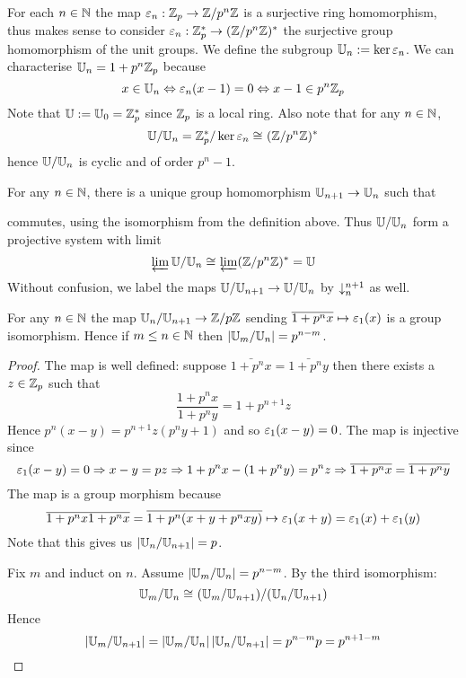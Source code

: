 \begin{dfn}[$\U_n$]
    For each $n \in \mathbb{N}$
    the map $\varepsilon_n: \mathbb{Z}_p \to \mathbb{Z}/p^{n}\mathbb{Z}$ is a surjective ring homomorphism,
    thus makes sense to consider $\varepsilon_n: \mathbb{Z}_p^* \to (\mathbb{Z}/p^{n}\mathbb{Z})^*$
    the surjective group homomorphism of the unit groups.
    We define the subgroup $\mathbb{U}_n := \ker \varepsilon_n$.
    We can characterise $\mathbb{U}_n = 1 + p^n \mathbb{Z}_p$ because
    \[x \in \mathbb{U}_n \Leftrightarrow \varepsilon_n(x - 1) = 0 \Leftrightarrow x - 1 \in p^n \mathbb{Z}_p\]
    Note that $\mathbb{U} := \mathbb{U}_0 = \mathbb{Z}_p^*$ since $\mathbb{Z}_p$ is a local ring.
    Also note that for any $n \in \mathbb{N}$,
    \[\mathbb{U} / \mathbb{U}_n = \mathbb{Z}_p^* / \ker \varepsilon_n \cong_{} (\mathbb{Z}/p^{n}\mathbb{Z})^*\]
    hence $\mathbb{U} / \mathbb{U}_n$ is cyclic and of order $p^n-1$.
\end{dfn}
\begin{prop}
    For any $n \in \mathbb{N}$, 
    there is a unique group homomorphism 
    $\mathbb{U}_{n+1} \to \mathbb{U}_n$ such that 
    \begin{center}
    \end{center}
    commutes, using the isomorphism from the definition above.
    Thus $\mathbb{U} / \mathbb{U}_n$ form a projective system with limit 
    \[\varprojlim \mathbb{U} / \mathbb{U}_n \cong_{} \varprojlim (\mathbb{Z}/p^{n}\mathbb{Z})^* = \mathbb{U}\]
    Without confusion, 
    we label the maps $\mathbb{U} / \mathbb{U}_{n + 1} \to \mathbb{U} / \mathbb{U}_n$
    by $\downarrow_{n}^{n+1}$ as well.
\end{prop}

\begin{prop}
    For any $n \in \mathbb{N}$ the map $\mathbb{U}_n / \mathbb{U}_{n+1} \to \mathbb{Z} / p\mathbb{Z}$
    sending $\overline{1 + p^n x} \mapsto \varepsilon_1 (x)$ is a group 
    isomorphism.
    Hence if $m \le n \in \mathbb{N}$ then $\left\vert \mathbb{U}_m / \mathbb{U}_n \right\vert = p^{n-m}$.
\end{prop}
\begin{proof}
    The map is well defined: suppose 
    $\bar{1 + p^n x} = \bar{1 + p^n y}$ then
    there exists a $z \in \mathbb{Z}_p$ such that
    \[\frac{1 + p^n x}{1 + p^n y} = 1 + p^{n+1} z\]
    Hence $p^n(x - y) = p^{n+1} z (p^n y + 1)$ and so 
    $\varepsilon_1(x - y) = 0$.
    The map is injective since 
    \[\varepsilon_1 (x - y) = 0 \Rightarrow x - y = p z 
    \Rightarrow 1 + p^n x - (1 + p^n y) = p^n z
    \Rightarrow \overline{1 + p^n x} = \overline{1 + p^n y}\]
    The map is a group morphism because 
    \[\overline{1 + p^n x}\overline{1 + p^n x} = \overline{1 + p^n (x + y + p^n xy)}
    \mapsto \varepsilon_1(x + y) = \varepsilon_1(x) + \varepsilon_1(y)\]
    Note that this gives us $\left\vert \mathbb{U}_n / \mathbb{U}_{n+1} \right\vert = p$.

    Fix $m$ and induct on $n$. 
    Assume $\left\vert \mathbb{U}_m / \mathbb{U}_n \right\vert = p^{n-m}$.
    By the third isomorphism:
    \[{\mathbb{U}_m / \mathbb{U}_n} \cong_{} (\mathbb{U}_m / \mathbb{U}_{n+1}) / (\mathbb{U}_n / \mathbb{U}_{n+1})\]
    Hence 
    \[\left\vert \mathbb{U}_m / \mathbb{U}_{n+1} \right\vert = 
    \left\vert \mathbb{U}_m / \mathbb{U}_n \right\vert \left\vert \mathbb{U}_n / \mathbb{U}_{n+1} \right\vert = p^{n-m} p = p^{n + 1 - m}\]
\end{proof}

